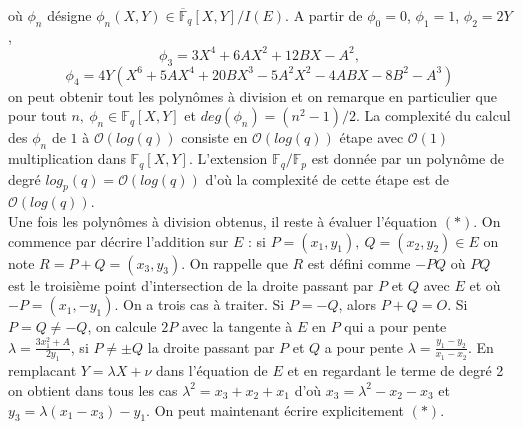 \documentclass{article}
\theoremstyle{definition}
\theoremstyle{plain}
\begin{document}
où $\phi_n$ désigne $\phi_n(X,Y)\in\overline{\mathbb{F}}_q[X,Y]/I(E)$. A partir de $\phi_0=0$, $\phi_1=1$, $\phi_2=2Y$, $$\phi_3=3X^4+6AX^2+12BX-A^2,$$ $$\phi_4=4Y(X^6+5AX^4+ 20BX^3-5A^2X^2-4ABX-8B^2-A^3)$$ on peut obtenir tout les polynômes à division et on remarque en particulier que pour tout $ n,~\phi_n\in\mathbb{F}_q[X,Y]$ et $deg(\phi_n)=(n^2-1)/2$. La complexité du calcul des $\phi_n$ de $1$ à $\mathcal{O}(log(q))$ consiste en $\mathcal{O}(log(q))$ étape avec $\mathcal{O}(1)$ multiplication dans $\mathbb{F}_q[X,Y]$. L'extension $\mathbb{F}_q/\mathbb{F}_p$ est donnée par un polynôme de degré $log_p(q)=\mathcal{O}(log(q))$ d'où la complexité de cette étape est de $\mathcal{O}(log(q))$.\\ \indent Une fois les polynômes à division obtenus, il reste à évaluer l'équation $(*)$. On commence par décrire l'addition sur $E$ : si $P=(x_1, y_1),~Q=(x_2,y_2)\in E$ on note $R=P+Q=(x_3, y_3)$. On rappelle que $R$ est défini comme $-PQ$ où $PQ$ est le troisième point d'intersection de la droite passant par $P$ et $Q$ avec $E$ et où $-P=(x_1, -y_1)$. On a trois cas à traiter. Si $P=-Q$, alors $P+Q=O$. Si $P=Q\ne -Q$, on calcule $2P$ avec la tangente à $E$ en $P$ qui a pour pente $\lambda=\frac{3x_1^2+A}{2y_1}$, si $P\ne \pm Q$ la droite passant par $P$ et $Q$ a pour pente $\lambda=\frac{y_1-y_2}{x_1-x_2}$. En remplacant $Y=\lambda X+\nu$ dans l'équation de $E$ et en regardant le terme de degré 2 on obtient dans tous les cas $\lambda^2=x_3+x_2+x_1$ d'où $x_3=\lambda^2-x_2-x_3$ et $y_3=\lambda(x_1-x_3)-y_1$. On peut maintenant écrire explicitement $(*)$.\\ 
\end{document}
